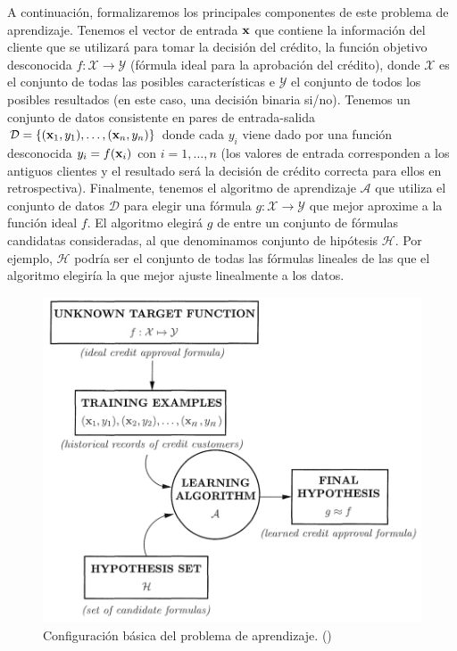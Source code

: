 \documentclass[oneside,openright,titlepage,numbers=noenddot,openany,headinclude,footinclude=true,
cleardoublepage=empty,abstractoff,BCOR=5mm,paper=a4,fontsize=12pt,main=spanish]{scrreprt}
\begin{document}
A continuación, formalizaremos los principales componentes de este problema de aprendizaje. Tenemos el vector de entrada $\textbf{x}$ que contiene la información del cliente que se utilizará para tomar la decisión del crédito, la función objetivo desconocida $f\colon \mathcal{X}\to \mathcal{Y}$ (fórmula ideal para la aprobación del crédito), donde $\mathcal{X}$ es el conjunto de todas las posibles características e $\mathcal{Y}$ el conjunto de todos los posibles resultados (en este caso, una decisión binaria si/no). Tenemos un conjunto de datos consistente en pares de entrada-salida $\mathcal{D}=\{(\textbf{x}_1,y_1),\dots,(\textbf{x}_n,y_n)\}$ donde cada  $y_i$ viene dado por una función desconocida $y_i=f(\textbf{x}_i)$ con $i=1,\dots,n$ (los valores de entrada corresponden a los antiguos clientes y el resultado será la decisión de crédito correcta para ellos en retrospectiva). Finalmente, tenemos el algoritmo de aprendizaje $\mathcal{A}$ que utiliza el
conjunto de datos $\mathcal{D}$ para elegir una fórmula $g\colon \mathcal{X}\to \mathcal{Y}$ que mejor aproxime a la función ideal $f$. El algoritmo
elegirá $g$ de entre un conjunto de fórmulas candidatas consideradas, al que denominamos conjunto de hipótesis $\mathcal{H}$. Por ejemplo, $\mathcal{H}$ podría ser el conjunto de todas las fórmulas lineales
de las que el algoritmo elegiría la que mejor ajuste linealmente a los datos.\\

\begin{figure}[h]
	\centering
	\includegraphics[width=12.4cm]{setup_learning.png}
	\caption{Configuración básica del problema de aprendizaje. (\cite{learning2012})}
    \label{fig:learningesq}
\end{figure}
\end{document}
